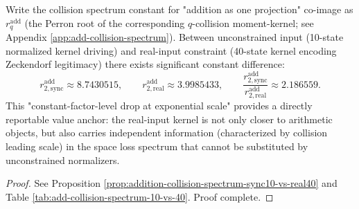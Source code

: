 \begin{conclusion}\label{con:xi-terminal-addition-collision-spectrum-constant-factor-drop}
Write the collision spectrum constant for "addition as one projection" co-image as \(r^{\mathrm{add}}_q\) (the Perron root of the corresponding \(q\)-collision moment-kernel; see Appendix \ref{app:add-collision-spectrum}).
Between unconstrained input (10-state normalized kernel driving) and real-input constraint (40-state kernel encoding Zeckendorf legitimacy) there exists significant constant difference:
\[
r^{\mathrm{add}}_{2,\mathrm{sync}}\approx 8.7430515,\qquad
r^{\mathrm{add}}_{2,\mathrm{real}}\approx 3.9985433,
\qquad
\frac{r^{\mathrm{add}}_{2,\mathrm{sync}}}{r^{\mathrm{add}}_{2,\mathrm{real}}}\approx 2.186559.
\]
This "constant-factor-level drop at exponential scale" provides a directly reportable value anchor: the real-input kernel is not only closer to arithmetic objects, but also carries independent information (characterized by collision leading scale) in the space loss spectrum that cannot be substituted by unconstrained normalizers.
\end{conclusion}
\begin{proof}[Proof]
See Proposition \ref{prop:addition-collision-spectrum-sync10-vs-real40} and Table \ref{tab:add-collision-spectrum-10-vs-40}. Proof complete.
\end{proof}

